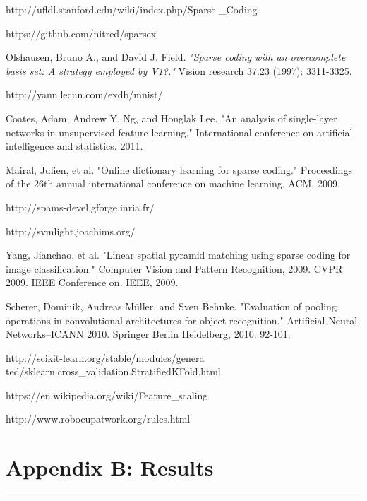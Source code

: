 \documentclass[	DIV=calc,%
				paper=a4,%
				fontsize=11pt,%
				twocolumn]{scrartcl}	 %
\newcommand{\HorRule}{\color{brsublue}%
					 \rule{\linewidth}{1pt}%
					 \color{black}
					 }
\begin{document}
\begin{thebibliography}{9}

http://ufldl.stanford.edu/wiki/index.php/Sparse
\_Coding

https://github.com/nitred/sparsex

Olshausen, Bruno A., and David J. Field. \textit{"Sparse coding with an overcomplete basis set: A strategy employed by V1?."} Vision research 37.23 (1997): 3311-3325.

http://yann.lecun.com/exdb/mnist/

Coates, Adam, Andrew Y. Ng, and Honglak Lee. "An analysis of single-layer networks in unsupervised feature learning." International conference on artificial intelligence and statistics. 2011.

Mairal, Julien, et al. "Online dictionary learning for sparse coding." Proceedings of the 26th annual international conference on machine learning. ACM, 2009.

http://spams-devel.gforge.inria.fr/

http://svmlight.joachims.org/

Yang, Jianchao, et al. "Linear spatial pyramid matching using sparse coding for image classification." Computer Vision and Pattern Recognition, 2009. CVPR 2009. IEEE Conference on. IEEE, 2009.

Scherer, Dominik, Andreas Müller, and Sven Behnke. "Evaluation of pooling operations in convolutional architectures for object recognition." Artificial Neural Networks–ICANN 2010. Springer Berlin Heidelberg, 2010. 92-101.

http://scikit-learn.org/stable/modules/genera
ted/sklearn.cross\_validation.StratifiedKFold.html

https://en.wikipedia.org/wiki/Feature\_scaling

http://www.robocupatwork.org/rules.html

\end{thebibliography}


\newpage

\onecolumn

\section*{Appendix B: Results}

\HorRule
\end{document}
